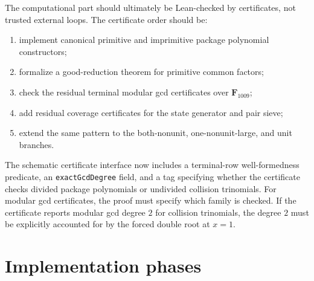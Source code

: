 \documentclass[11pt]{article}
\begin{document}
The computational part should ultimately be Lean-checked by certificates, not
trusted external loops.  The certificate order should be:
\begin{enumerate}[label=(\arabic*)]
\item implement canonical primitive and imprimitive package polynomial
      constructors;
\item formalize a good-reduction theorem for primitive common factors;
\item check the residual terminal modular gcd certificates over
      $\mathbf F_{1009}$;
\item add residual coverage certificates for the state generator and pair
      sieve;
\item extend the same pattern to the both-nonunit, one-nonunit-large, and unit
      branches.
\end{enumerate}

The schematic certificate interface now includes a terminal-row well-formedness
predicate, an \verb|exactGcdDegree| field, and a tag specifying whether the
certificate checks divided package polynomials or undivided collision
trinomials.  For modular gcd certificates, the proof must specify which family
is checked.  If the certificate reports modular gcd degree $2$ for collision
trinomials, the degree $2$ must be explicitly accounted for by the forced
double root at $x=1$.

\section{Implementation phases}
\end{document}
